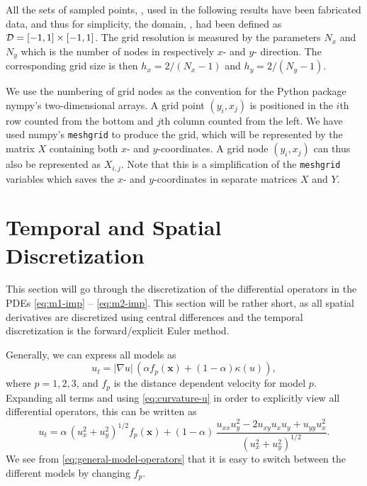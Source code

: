 All the sets of sampled points, \pointset, used in the following results have been fabricated data, and thus for simplicity, the domain, \domain, had been defined as $\mathcal{D} = [-1, 1]\times [-1, 1]$. The grid resolution is measured by the parameters $N_x$ and $N_y$ which is the number of nodes in respectively $x$- and $y$- direction. The corresponding grid size is then $h_x = 2/(N_x-1)$ and $h_y = 2/(N_y-1)$. 

We use the numbering of grid nodes as the convention for the Python package nympy's two-dimensional arrays. A grid point $(y_i, x_j)$ is positioned in the $i$th row counted from the bottom and $j$th column counted from the left. We have used numpy's \texttt{meshgrid} to produce the grid, which will be represented by the matrix $X$ containing both $x$- and $y$-coordinates. A grid node $(y_i, x_j)$ can thus also be represented as $X_{i, j}$. Note that this is a simplification of the \texttt{meshgrid} variables which saves the $x$- and $y$-coordinates in separate matrices $X$ and $Y$. 

\clearpage


\section{Temporal and Spatial Discretization} \label{sec:discretization}
This section will go through the discretization of the differential operators in the PDEs \eqref{eq:m1-imp} -- \eqref{eq:m2-imp}. This section will be rather short, as all spatial derivatives are discretized using central differences and the temporal discretization is the forward/explicit Euler method. 

Generally, we can express all models as 
\begin{equation*}
    u_t = |\nabla u| \, (\alpha f_p(\mathbf{x}) + (1-\alpha) \kappa(u)),
\end{equation*}
where $p=1, 2, 3$, and $f_p$ is the distance dependent velocity for model $p$. Expanding all terms and using \eqref{eq:curvature-u} in order to explicitly view all differential operators, this can be written as
\begin{equation}
    u_t = \alpha\, (u_x^2+u_y^2)^{1/2} f_p(\mathbf{x}) + (1-\alpha)\, \frac{u_{xx} u_y^2- 2u_{xy}u_xu_y + u_{yy}u_x^2}{(u_x^2+u_y^2)^{1/2}}.
    \label{eq:general-model-operators}
\end{equation}
We see from \eqref{eq:general-model-operators} that it is easy to switch between the different models by changing $f_p$.

